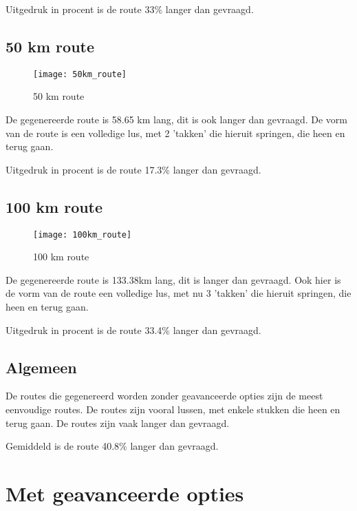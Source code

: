 Uitgedruk in procent is de route 33\% langer dan gevraagd.

\subsection{50 km route}

\begin{figure}[H]
    \centering
    \texttt{[image: 50km\_route]}
    \caption{50 km route}
    \label{fig:50km_route}

\end{figure}

De gegenereerde route is 58.65 km lang, dit is ook langer dan gevraagd. De vorm van de route is een volledige lus, met 2 'takken' die hieruit springen, die heen en terug gaan.

Uitgedruk in procent is de route 17.3\% langer dan gevraagd.

\subsection{100 km route}

\begin{figure}[H]
    \centering
    \texttt{[image: 100km\_route]}
    \caption{100 km route}
    \label{fig:100km_route}

\end{figure}

De gegenereerde route is 133.38km lang, dit is langer dan gevraagd. Ook hier is de vorm van de route een volledige lus, met nu 3 'takken' die hieruit springen, die heen en terug gaan.

Uitgedruk in procent is de route 33.4\% langer dan gevraagd.

\pagebreak

\subsection{Algemeen}

De routes die gegenereerd worden zonder geavanceerde opties zijn de meest eenvoudige routes. De routes zijn vooral lussen, met enkele stukken die heen en terug gaan. De routes zijn vaak langer dan gevraagd.

Gemiddeld is de route 40.8\% langer dan gevraagd.

\section{Met geavanceerde opties}

